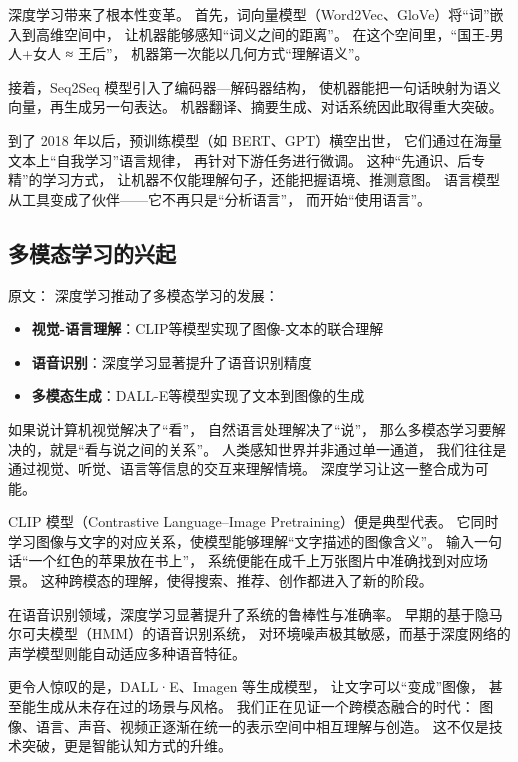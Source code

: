深度学习带来了根本性变革。  
首先，词向量模型（Word2Vec、GloVe）将“词”嵌入到高维空间中，  
让机器能够感知“词义之间的距离”。  
在这个空间里，“国王-男人+女人 ≈ 王后”，  
机器第一次能以几何方式“理解语义”。  

接着，Seq2Seq 模型引入了编码器—解码器结构，  
使机器能把一句话映射为语义向量，再生成另一句表达。  
机器翻译、摘要生成、对话系统因此取得重大突破。  

到了 2018 年以后，预训练模型（如 BERT、GPT）横空出世，  
它们通过在海量文本上“自我学习”语言规律，  
再针对下游任务进行微调。  
这种“先通识、后专精”的学习方式，  
让机器不仅能理解句子，还能把握语境、推测意图。  
语言模型从工具变成了伙伴——它不再只是“分析语言”，  
而开始“使用语言”。


\subsection{多模态学习的兴起}

原文：
深度学习推动了多模态学习的发展：
\begin{itemize}
\item {\bf 视觉-语言理解}：CLIP等模型实现了图像-文本的联合理解
\item {\bf 语音识别}：深度学习显著提升了语音识别精度
\item {\bf 多模态生成}：DALL-E等模型实现了文本到图像的生成
\end{itemize}
如果说计算机视觉解决了“看”，  
自然语言处理解决了“说”，  
那么多模态学习要解决的，就是“看与说之间的关系”。  
人类感知世界并非通过单一通道，  
我们往往是通过视觉、听觉、语言等信息的交互来理解情境。  
深度学习让这一整合成为可能。  

CLIP 模型（Contrastive Language–Image Pretraining）便是典型代表。  
它同时学习图像与文字的对应关系，使模型能够理解“文字描述的图像含义”。  
输入一句话“一个红色的苹果放在书上”，  
系统便能在成千上万张图片中准确找到对应场景。  
这种跨模态的理解，使得搜索、推荐、创作都进入了新的阶段。  

在语音识别领域，深度学习显著提升了系统的鲁棒性与准确率。  
早期的基于隐马尔可夫模型（HMM）的语音识别系统，  
对环境噪声极其敏感，而基于深度网络的声学模型则能自动适应多种语音特征。  

更令人惊叹的是，DALL·E、Imagen 等生成模型，  
让文字可以“变成”图像，  
甚至能生成从未存在过的场景与风格。  
我们正在见证一个跨模态融合的时代：  
图像、语言、声音、视频正逐渐在统一的表示空间中相互理解与创造。  
这不仅是技术突破，更是智能认知方式的升维。

